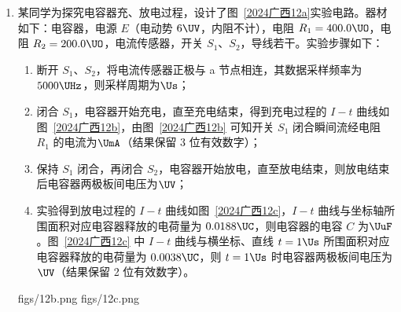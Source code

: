 \documentclass[\gkver]{gaokaozhenti}
\begin{document}
\begin{enumerate}

\item
某同学为探究电容器充、放电过程，设计了图~\ref{2024广西12a}实验电路。器材如下：电容器，电源 $E$（电动势 $6 \UV$，内阻不计），电阻 $R_{1} = 400.0 \UO$，电阻 $R_{2} = 200.0 \UO$，电流传感器，开关 $S_{1}$、$S_{2}$，导线若干。实验步骤如下：
\begin{enumerate}
	\item
	断开 $S_{1}$、$S_{2}$，将电流传感器正极与 a 节点相连，其数据采样频率为 $5000 \UHz$，则采样周期为$\Us$；
	\item
	闭合 $S_{1}$，电容器开始充电，直至充电结束，得到充电过程的 $I - t$ 曲线如图~\ref{2024广西12b}，由图~\ref{2024广西12b} 可知开关 $S_{1}$ 闭合瞬间流经电阻 $R_{1}$ 的电流为$\UmA$（结果保留 3 位有效数字）；
	\item
	保持 $S_{1}$ 闭合，再闭合 $S_{2}$，电容器开始放电，直至放电结束，则放电结束后电容器两极板间电压为$\UV$；
	\item
	实验得到放电过程的 $I - t$ 曲线如图~\ref{2024广西12c}，$I - t$ 曲线与坐标轴所围面积对应电容器释放的电荷量为 $0.0188 \UC$，则电容器的电容 $C$ 为$\UuF$。图~\ref{2024广西12c} 中 $I - t$ 曲线与横坐标、直线 $t = 1 \Us$ 所围面积对应电容器释放的电荷量为 $0.0038 \UC$，则 $t = 1 \Us$ 时电容器两极板间电压为$\UV$（结果保留 2 位有效数字）。
\end{enumerate}
{figs/12b.png}
{figs/12c.png}


\end{enumerate}
\end{document}
